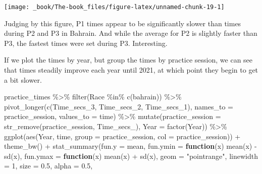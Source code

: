 \documentclass[
]{book}
\newenvironment{Shaded}{\begin{snugshade}}{\end{snugshade}}
\newcommand{\AttributeTok}[1]{\textcolor[rgb]{0.77,0.63,0.00}{#1}}
\newcommand{\ControlFlowTok}[1]{\textcolor[rgb]{0.13,0.29,0.53}{\textbf{#1}}}
\newcommand{\DecValTok}[1]{\textcolor[rgb]{0.00,0.00,0.81}{#1}}
\newcommand{\FloatTok}[1]{\textcolor[rgb]{0.00,0.00,0.81}{#1}}
\newcommand{\FunctionTok}[1]{\textcolor[rgb]{0.00,0.00,0.00}{#1}}
\newcommand{\NormalTok}[1]{#1}
\newcommand{\SpecialCharTok}[1]{\textcolor[rgb]{0.00,0.00,0.00}{#1}}
\newcommand{\StringTok}[1]{\textcolor[rgb]{0.31,0.60,0.02}{#1}}
\begin{document}
\begin{center}\texttt{[image: \_book/The-book\_files/figure-latex/unnamed-chunk-19-1]} \end{center}

Judging by this figure, P1 times appear to be significantly slower than times during P2 and P3 in Bahrain. And while the average for P2 is slightly faster than P3, the fastest times were set during P3. Interesting.

If we plot the times by year, but group the times by practice session, we can see that times steadily improve each year until 2021, at which point they begin to get a bit slower.

\begin{Shaded}
\begin{Highlighting}[]
\NormalTok{practice\_times }\SpecialCharTok{\%\textgreater{}\%}
  \FunctionTok{filter}\NormalTok{(Race }\SpecialCharTok{\%in\%} \FunctionTok{c}\NormalTok{(}\StringTok{\textquotesingle{}bahrain\textquotesingle{}}\NormalTok{)) }\SpecialCharTok{\%\textgreater{}\%} 
  \FunctionTok{pivot\_longer}\NormalTok{(}\FunctionTok{c}\NormalTok{(Time\_secs\_3, Time\_secs\_2, Time\_secs\_1), }\AttributeTok{names\_to =} \StringTok{\textquotesingle{}practice\_session\textquotesingle{}}\NormalTok{, }\AttributeTok{values\_to =} \StringTok{\textquotesingle{}time\textquotesingle{}}\NormalTok{) }\SpecialCharTok{\%\textgreater{}\%}
  \FunctionTok{mutate}\NormalTok{(}\AttributeTok{practice\_session =} \FunctionTok{str\_remove}\NormalTok{(practice\_session, }\StringTok{\textquotesingle{}Time\_secs\_\textquotesingle{}}\NormalTok{),}
         \AttributeTok{Year =} \FunctionTok{factor}\NormalTok{(Year)) }\SpecialCharTok{\%\textgreater{}\%}
  \FunctionTok{ggplot}\NormalTok{(}\FunctionTok{aes}\NormalTok{(Year, time, }
               \AttributeTok{group =}\NormalTok{ practice\_session, }\AttributeTok{col =}\NormalTok{ practice\_session)) }\SpecialCharTok{+}
  \FunctionTok{theme\_bw}\NormalTok{() }\SpecialCharTok{+}
  \FunctionTok{stat\_summary}\NormalTok{(}\AttributeTok{fun.y =}\NormalTok{ mean,}
               \AttributeTok{fun.ymin =} \ControlFlowTok{function}\NormalTok{(x) }\FunctionTok{mean}\NormalTok{(x) }\SpecialCharTok{{-}} \FunctionTok{sd}\NormalTok{(x), }
               \AttributeTok{fun.ymax =} \ControlFlowTok{function}\NormalTok{(x) }\FunctionTok{mean}\NormalTok{(x) }\SpecialCharTok{+} \FunctionTok{sd}\NormalTok{(x), }
               \AttributeTok{geom =} \StringTok{"pointrange"}\NormalTok{, }
               \AttributeTok{linewidth =} \DecValTok{1}\NormalTok{, }\AttributeTok{size =} \FloatTok{0.5}\NormalTok{, }\AttributeTok{alpha =} \FloatTok{0.5}\NormalTok{,}

\end{Highlighting}
\end{Shaded}
\end{document}
